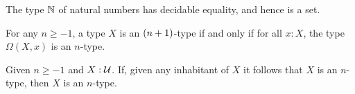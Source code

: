 \documentclass[hott-all.tex]{subfiles}
\begin{document}
% 
% 
\begin{thm}
 The type $\mathbb{N}$ of natural numbers has decidable equality, and hence is a set.
\end{thm}
% 
% 
% 
% 
% 
\begin{thm}
  For any $n\geq -1$, a type $X$ is an $(n+1)$-type if and only if for all $x : X$, the type $\Omega(X, x)$ is an $n$-type.
\end{thm}
% 
% 
\begin{lem}
  Given $n \geq -1$ and $X : \mathcal{U}$.
  If, given any inhabitant of $X$ it follows that $X$ is an $n$-type, then $X$ is an $n$-type.
\end{lem}
\end{document}
